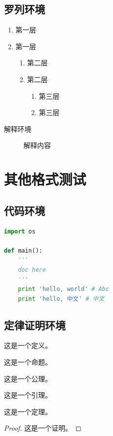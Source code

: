 \documentclass[format=draft,language=chinese,category=SDN]{hustreport}
\begin{document}
\section{罗列环境}

\begin{enumerate}
    \item 第一层\label{item:1}
    \item 第一层
    \begin{enumerate}
        \item 第二层\label{item:2}
        \item 第二层
        \begin{enumerate}
            \item 第三层\label{item:3}
            \item 第三层
        \end{enumerate}
    \end{enumerate}
\end{enumerate}

\begin{description}
    \item[解释环境]  解释内容
\end{description}

\chapter{其他格式测试}

\section{代码环境}

\begin{lstlisting}[language=python]
import os

def main():
    '''
    doc here
    '''
    print 'hello, world' # Abc
    print 'hello, 中文' # 中文
\end{lstlisting}

\section{定律证明环境}

\begin{definition}\label{def:1}
这是一个定义。
\end{definition}
\begin{proposition}\label{proposition:1}
这是一个命题。
\end{proposition}
\begin{axiom}\label{axiom:1}
这是一个公理。
\end{axiom}
\begin{lemma}\label{lemma:1}
这是一个引理。
\end{lemma}
\begin{theorem}\label{theorem:1}
这是一个定理。
\end{theorem}
\begin{proof}\label{proof:1}
这是一个证明。
\end{proof}
\end{document}
